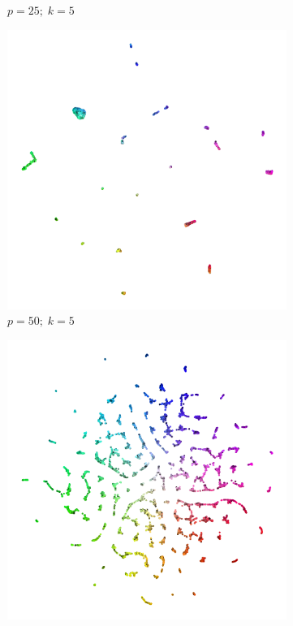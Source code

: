 \begin{figure}[!p]
\begin{subfigure}{0.3\linewidth}
    \caption{$p = 25;\; k = 5$}
\end{subfigure}
\begin{subfigure}{0.3\linewidth}
  \centering
    \includegraphics[width=\linewidth]{img/ktsne_color_n_10000_embedding_eta_200_p_50_l_100_crosspolytope_k_5_K_5_pca_x_12_X_1_s_666-1}
    \caption{$p = 50;\; k = 5$}
\end{subfigure}
\par\bigskip
  \begin{subfigure}{0.3\linewidth}
    \centering
    \includegraphics[width=\linewidth]{img/ktsne_color_n_10000_embedding_eta_200_p_5_l_100_crosspolytope_k_50_K_50_pca_x_12_X_1_s_666-1}

\end{subfigure}
\end{figure}
